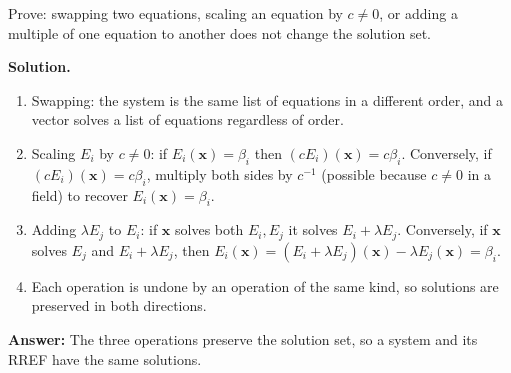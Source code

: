 \documentclass[11pt]{article}
\begin{document}
\begin{tcolorbox}[breakable,colback=white,colframe=ink!60,title={\bfseries Example 8 \textperiodcentered\ Proof: row reduction does not change the solutions}]Prove: swapping two equations, scaling an equation by $c\neq0$, or adding a multiple of one equation to another does not change the solution set.
\par\smallskip
\textbf{Solution.} \begin{enumerate}[leftmargin=1.6em,itemsep=1pt,topsep=2pt,label=\arabic*.]\item Swapping: the system is the same list of equations in a different order, and a vector solves a list of equations regardless of order.
\item Scaling $E_i$ by $c\neq0$: if $E_i(\mathbf x)=\beta_i$ then $(cE_i)(\mathbf x)=c\beta_i$. Conversely, if $(cE_i)(\mathbf x)=c\beta_i$, multiply both sides by $c^{-1}$ (possible because $c\neq0$ in a field) to recover $E_i(\mathbf x)=\beta_i$.
\item Adding $\lambda E_j$ to $E_i$: if $\mathbf x$ solves both $E_i,E_j$ it solves $E_i+\lambda E_j$. Conversely, if $\mathbf x$ solves $E_j$ and $E_i+\lambda E_j$, then $E_i(\mathbf x)=(E_i+\lambda E_j)(\mathbf x)-\lambda E_j(\mathbf x)=\beta_i$.
\item Each operation is undone by an operation of the same kind, so solutions are preserved in both directions.
\end{enumerate}\textbf{Answer:} The three operations preserve the solution set, so a system and its RREF have the same solutions.
\end{tcolorbox}
\newpage
\end{document}
